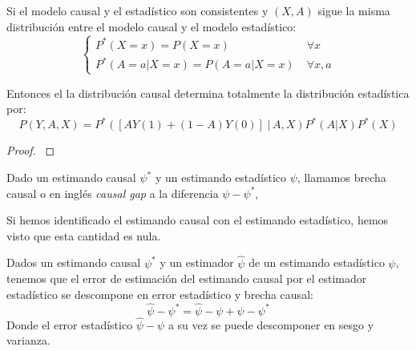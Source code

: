 \begin{proposicion}
	Si el modelo causal y el estadístico son consistentes
	y $(X, A)$ sigue la misma distribución entre el modelo causal y el modelo estadístico:
	$$
		\begin{cases}
			P^*(X = x) = P(X = x) \;                 & \forall x    \\
			P^*(A = a | X = x) = P(A = a | X = x) \; & \forall x, a
		\end{cases}
	$$

	Entonces el la distribución causal determina totalmente la distribución estadística por:
	$$ P(Y, A, X) = P^*([AY(1) + (1 - A)Y(0)] \; |\, A, X) P^*(A | X) P^*(X) $$
\end{proposicion}

\begin{proof} \cite[sección 2.1]{mci}
\end{proof}

\begin{definicion}\cite[sección 2.3]{mci}
	Dado un estimando causal $\psi^*$ y un estimando estadístico $\psi$, llamamos brecha causal o en inglés \textit{causal gap} a la diferencia $\psi - \psi^*$,

	Si hemos identificado el estimando causal con el estimando estadístico, hemos visto
	que esta cantidad es nula.
\end{definicion}

\begin{corolario}
	Dados un estimando causal $\psi^*$ y un estimador $\hat\psi$ de un estimando estadístico $\psi$, tenemos
	que el error de estimación del estimando causal por el estimador estadístico se descompone en
	error estadístico y brecha causal:
	$$
		\hat{\psi} - \psi^* = \hat \psi - \psi + \psi - \psi^*
	$$
	Donde el error estadístico $\hat \psi - \psi$ a su vez se puede descomponer en sesgo y varianza.
\end{corolario}

